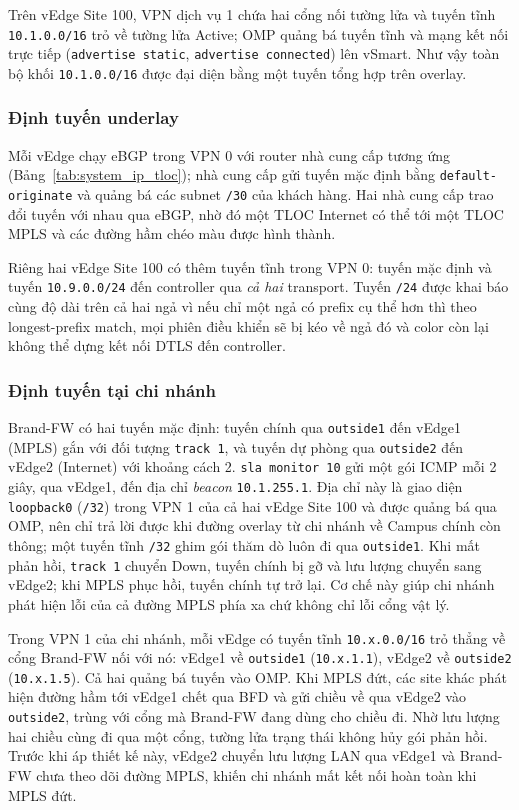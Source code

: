 Trên vEdge Site 100, VPN dịch vụ 1 chứa hai cổng nối tường lửa và tuyến tĩnh \texttt{10.1.0.0/16} trỏ về tường lửa Active; OMP quảng bá tuyến tĩnh và mạng kết nối trực tiếp (\texttt{advertise static}, \texttt{advertise connected}) lên vSmart. Như vậy toàn bộ khối \texttt{10.1.0.0/16} được đại diện bằng một tuyến tổng hợp trên overlay.

\subsubsection{Định tuyến underlay}

Mỗi vEdge chạy eBGP trong VPN 0 với router nhà cung cấp tương ứng (Bảng~\ref{tab:system_ip_tloc}); nhà cung cấp gửi tuyến mặc định bằng \texttt{default-originate} và quảng bá các subnet \texttt{/30} của khách hàng. Hai nhà cung cấp trao đổi tuyến với nhau qua eBGP, nhờ đó một TLOC Internet có thể tới một TLOC MPLS và các đường hầm chéo màu được hình thành.

Riêng hai vEdge Site 100 có thêm tuyến tĩnh trong VPN 0: tuyến mặc định và tuyến \texttt{10.9.0.0/24} đến controller qua \textit{cả hai} transport. Tuyến \texttt{/24} được khai báo cùng độ dài trên cả hai ngả vì nếu chỉ một ngả có prefix cụ thể hơn thì theo longest-prefix match, mọi phiên điều khiển sẽ bị kéo về ngả đó và color còn lại không thể dựng kết nối DTLS đến controller.

\subsubsection{Định tuyến tại chi nhánh}

Brand-FW có hai tuyến mặc định: tuyến chính qua \texttt{outside1} đến vEdge1 (MPLS) gắn với đối tượng \texttt{track 1}, và tuyến dự phòng qua \texttt{outside2} đến vEdge2 (Internet) với khoảng cách 2. \texttt{sla monitor 10} gửi một gói ICMP mỗi 2 giây, qua vEdge1, đến địa chỉ \textit{beacon} \texttt{10.1.255.1}. Địa chỉ này là giao diện \texttt{loopback0} (\texttt{/32}) trong VPN 1 của cả hai vEdge Site 100 và được quảng bá qua OMP, nên chỉ trả lời được khi đường overlay từ chi nhánh về Campus chính còn thông; một tuyến tĩnh \texttt{/32} ghim gói thăm dò luôn đi qua \texttt{outside1}. Khi mất phản hồi, \texttt{track 1} chuyển Down, tuyến chính bị gỡ và lưu lượng chuyển sang vEdge2; khi MPLS phục hồi, tuyến chính tự trở lại. Cơ chế này giúp chi nhánh phát hiện lỗi của cả đường MPLS phía xa chứ không chỉ lỗi cổng vật lý.

Trong VPN 1 của chi nhánh, mỗi vEdge có tuyến tĩnh \texttt{10.x.0.0/16} trỏ thẳng về cổng Brand-FW nối với nó: vEdge1 về \texttt{outside1} (\texttt{10.x.1.1}), vEdge2 về \texttt{outside2} (\texttt{10.x.1.5}). Cả hai quảng bá tuyến vào OMP. Khi MPLS đứt, các site khác phát hiện đường hầm tới vEdge1 chết qua BFD và gửi chiều về qua vEdge2 vào \texttt{outside2}, trùng với cổng mà Brand-FW đang dùng cho chiều đi. Nhờ lưu lượng hai chiều cùng đi qua một cổng, tường lửa trạng thái không hủy gói phản hồi. Trước khi áp thiết kế này, vEdge2 chuyển lưu lượng LAN qua vEdge1 và Brand-FW chưa theo dõi đường MPLS, khiến chi nhánh mất kết nối hoàn toàn khi MPLS đứt.

